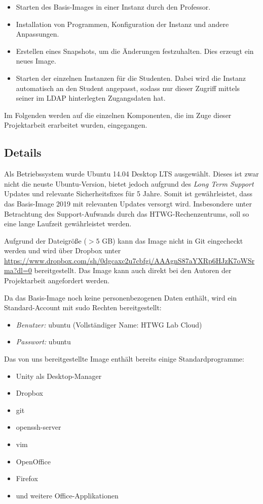 \begin{itemize}
\item Starten des Basis-Images in einer Instanz durch den Professor.
\item Installation von Programmen, Konfiguration der Instanz und andere Anpassungen.
\item Erstellen eines Snapshots, um die Änderungen festzuhalten. Dies erzeugt ein neues Image.
\item Starten der einzelnen Instanzen für die Studenten. Dabei wird die Instanz automatisch an den Student angepasst, sodass nur dieser Zugriff mittels seiner im LDAP hinterlegten Zugangsdaten hat.
\end{itemize}

Im Folgenden werden auf die einzelnen Komponenten, die im Zuge dieser Projektarbeit erarbeitet wurden, eingegangen.

\subsection{Details}

Als Betriebssystem wurde Ubuntu 14.04 Desktop LTS ausgewählt. 
Dieses ist zwar nicht die neuste Ubuntu-Version, bietet jedoch aufgrund des \emph{Long Term Support} Updates und relevante Sicherheitsfixes für 5 Jahre. 
Somit ist gewährleistet, dass das Basis-Image 2019 mit relevanten Updates versorgt wird. 
Insbesondere unter Betrachtung des Support-Aufwands durch das HTWG-Rechenzentrums, soll so eine lange Laufzeit gewährleistet werden.

Aufgrund der Dateigröße ($> 5$ GB) kann das Image nicht in Git eingecheckt werden und wird über Dropbox unter \url{https://www.dropbox.com/sh/0dgcaxc2u7cbfgi/AAAgnS87aYXRp6HJzK7oWSrma?dl=0} bereitgestellt. Das Image kann auch direkt bei den Autoren der Projektarbeit angefordert werden.

Da das Basis-Image noch keine personenbezogenen Daten enthält, wird ein Standard-Account mit sudo Rechten bereitgestellt:

\begin{itemize}
\item \emph{Benutzer:} ubuntu (Vollständiger Name: HTWG Lab Cloud)
\item \emph{Passwort:} ubuntu
\end{itemize}

Das von uns bereitgestellte Image enthält bereits einige Standardprogramme:

\begin{itemize}
\item Unity als Desktop-Manager
\item Dropbox
\item git
\item openssh-server
\item vim
\item OpenOffice
\item Firefox
\item und weitere Office-Applikationen
\end{itemize}


